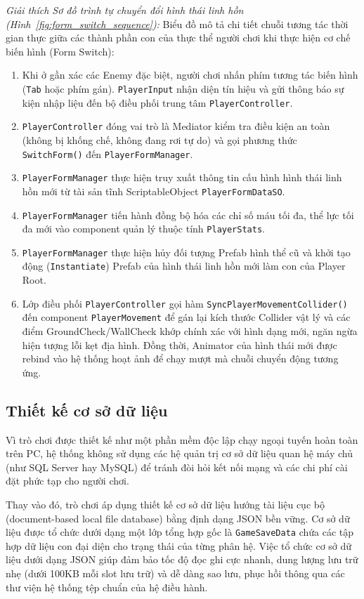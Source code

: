\documentclass[../DoAn.tex]{subfiles}
\begin{document}
\textit{Giải thích Sơ đồ trình tự chuyển đổi hình thái linh hồn (Hình~\ref{fig:form_switch_sequence}):}
Biểu đồ mô tả chi tiết chuỗi tương tác thời gian thực giữa các thành phần con của thực thể người chơi khi thực hiện cơ chế biến hình (Form Switch):
\begin{enumerate}
    \item Khi ở gần xác các Enemy đặc biệt, người chơi nhấn phím tương tác biến hình (\texttt{Tab} hoặc phím gán). \texttt{PlayerInput} nhận diện tín hiệu và gửi thông báo sự kiện nhập liệu đến bộ điều phối trung tâm \texttt{PlayerController}.
    \item \texttt{PlayerController} đóng vai trò là Mediator kiểm tra điều kiện an toàn (không bị khống chế, không đang rơi tự do) và gọi phương thức \texttt{SwitchForm()} đến \texttt{PlayerFormManager}.
    \item \texttt{PlayerFormManager} thực hiện truy xuất thông tin cấu hình hình thái linh hồn mới từ tài sản tĩnh ScriptableObject \texttt{PlayerFormDataSO}.
    \item \texttt{PlayerFormManager} tiến hành đồng bộ hóa các chỉ số máu tối đa, thể lực tối đa mới vào component quản lý thuộc tính \texttt{PlayerStats}.
    \item \texttt{PlayerFormManager} thực hiện hủy đối tượng Prefab hình thể cũ và khởi tạo động (\texttt{Instantiate}) Prefab của hình thái linh hồn mới làm con của Player Root.
    \item Lớp điều phối \texttt{PlayerController} gọi hàm \texttt{SyncPlayerMovementCollider()} đến component \texttt{PlayerMovement} để gán lại kích thước Collider vật lý và các điểm GroundCheck/WallCheck khớp chính xác với hình dạng mới, ngăn ngừa hiện tượng lỗi kẹt địa hình. Đồng thời, Animator của hình thái mới được rebind vào hệ thống hoạt ảnh để chạy mượt mà chuỗi chuyển động tương ứng.
\end{enumerate}


\subsection{Thiết kế cơ sở dữ liệu}
\label{subsection:5.3.2}
Vì trò chơi được thiết kế như một phần mềm độc lập chạy ngoại tuyến hoàn toàn trên PC, hệ thống không sử dụng các hệ quản trị cơ sở dữ liệu quan hệ máy chủ (như SQL Server hay MySQL) để tránh đòi hỏi kết nối mạng và các chi phí cài đặt phức tạp cho người chơi.

Thay vào đó, trò chơi áp dụng thiết kế cơ sở dữ liệu hướng tài liệu cục bộ (document-based local file database) bằng định dạng JSON bền vững. Cơ sở dữ liệu được tổ chức dưới dạng một lớp tổng hợp gốc là \texttt{GameSaveData} chứa các tập hợp dữ liệu con đại diện cho trạng thái của từng phân hệ. Việc tổ chức cơ sở dữ liệu dưới dạng JSON giúp đảm bảo tốc độ đọc ghi cực nhanh, dung lượng lưu trữ nhẹ (dưới 100KB mỗi slot lưu trữ) và dễ dàng sao lưu, phục hồi thông qua các thư viện hệ thống tệp chuẩn của hệ điều hành.
\end{document}
